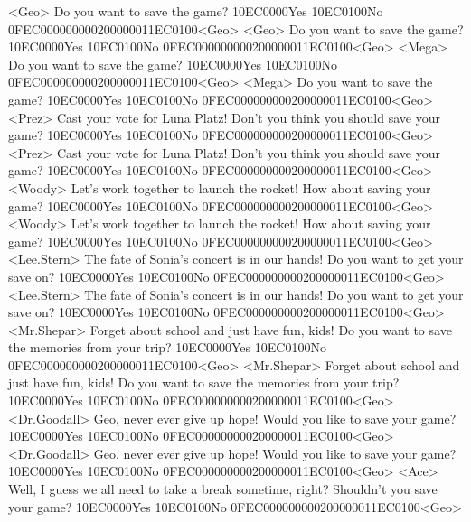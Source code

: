 <Geo> Do you want to save the game? {10}{EC}{00}{00}Yes {10}{EC}{01}{00}No {0F}{EC}{00}{00}{00}{00}{02}{00}{00}{00}{11}{EC}{01}{00}<Geo>
<Geo> Do you want to save the game? {10}{EC}{00}{00}Yes {10}{EC}{01}{00}No {0F}{EC}{00}{00}{00}{00}{02}{00}{00}{00}{11}{EC}{01}{00}<Geo>
<Mega> Do you want to save the game? {10}{EC}{00}{00}Yes {10}{EC}{01}{00}No {0F}{EC}{00}{00}{00}{00}{02}{00}{00}{00}{11}{EC}{01}{00}<Geo>
<Mega> Do you want to save the game? {10}{EC}{00}{00}Yes {10}{EC}{01}{00}No {0F}{EC}{00}{00}{00}{00}{02}{00}{00}{00}{11}{EC}{01}{00}<Geo>
<Prez> Cast your vote for Luna Platz! 
Don't you think you should save your game? {10}{EC}{00}{00}Yes {10}{EC}{01}{00}No {0F}{EC}{00}{00}{00}{00}{02}{00}{00}{00}{11}{EC}{01}{00}<Geo>
<Prez> Cast your vote for Luna Platz! 
Don't you think you should save your game? {10}{EC}{00}{00}Yes {10}{EC}{01}{00}No {0F}{EC}{00}{00}{00}{00}{02}{00}{00}{00}{11}{EC}{01}{00}<Geo>
<Woody> Let's work together to launch the rocket! 
How about saving your game? {10}{EC}{00}{00}Yes {10}{EC}{01}{00}No {0F}{EC}{00}{00}{00}{00}{02}{00}{00}{00}{11}{EC}{01}{00}<Geo>
<Woody> Let's work together to launch the rocket! 
How about saving your game? {10}{EC}{00}{00}Yes {10}{EC}{01}{00}No {0F}{EC}{00}{00}{00}{00}{02}{00}{00}{00}{11}{EC}{01}{00}<Geo>
<Lee.Stern> The fate of Sonia's concert is in our hands! 
Do you want to get your save on? {10}{EC}{00}{00}Yes {10}{EC}{01}{00}No {0F}{EC}{00}{00}{00}{00}{02}{00}{00}{00}{11}{EC}{01}{00}<Geo>
<Lee.Stern> The fate of Sonia's concert is in our hands! 
Do you want to get your save on? {10}{EC}{00}{00}Yes {10}{EC}{01}{00}No {0F}{EC}{00}{00}{00}{00}{02}{00}{00}{00}{11}{EC}{01}{00}<Geo>
<Mr.Shepar> Forget about school and just have fun, kids! 
Do you want to save the memories from your trip? {10}{EC}{00}{00}Yes {10}{EC}{01}{00}No {0F}{EC}{00}{00}{00}{00}{02}{00}{00}{00}{11}{EC}{01}{00}<Geo>
<Mr.Shepar> Forget about school and just have fun, kids! 
Do you want to save the memories from your trip? {10}{EC}{00}{00}Yes {10}{EC}{01}{00}No {0F}{EC}{00}{00}{00}{00}{02}{00}{00}{00}{11}{EC}{01}{00}<Geo>
<Dr.Goodall> Geo, never ever give up hope! 
Would you like to save your game? {10}{EC}{00}{00}Yes {10}{EC}{01}{00}No {0F}{EC}{00}{00}{00}{00}{02}{00}{00}{00}{11}{EC}{01}{00}<Geo>
<Dr.Goodall> Geo, never ever give up hope! 
Would you like to save your game? {10}{EC}{00}{00}Yes {10}{EC}{01}{00}No {0F}{EC}{00}{00}{00}{00}{02}{00}{00}{00}{11}{EC}{01}{00}<Geo>
<Ace> Well, I guess we all need to take a break sometime, right? 
Shouldn't you save your game? {10}{EC}{00}{00}Yes {10}{EC}{01}{00}No {0F}{EC}{00}{00}{00}{00}{02}{00}{00}{00}{11}{EC}{01}{00}<Geo>
